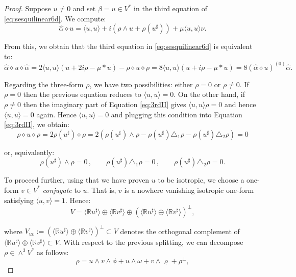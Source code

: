 \documentclass[10pt,a4paper]{amsart}
\newcommand{\escal}[1]{\langle#1\rangle}
\begin{document}
\begin{proof}
Suppose $u\neq 0$ and set $\beta = u\in V^*$ in the third equation of \eqref{eq:sesquilinear6d}. We compute:
\begin{equation*}
\widehat{\alpha}\diamond u=\escal{u,u}+i(\rho\wedge u+\rho(u^\sharp))+\mu\escal{u,u}\nu.
\end{equation*}

\noindent
From this, we obtain that the third equation in \eqref{eq:sesquilinear6d} is equivalent to:
\begin{equation}
\label{eq:3rdII}
\widehat{\alpha}\diamond u\diamond\widehat{\alpha}=2\escal{u,u}(u+2i\rho-\mu*u)-\rho\diamond u\diamond\rho=8\escal{u,u}(u + i \rho  - \mu \ast u)=8 (\widehat{\alpha}\diamond u)^{(0)}\widehat{\alpha}.
\end{equation}

\noindent
Regarding the three-form $\rho$, we have two possibilities: either $\rho = 0$ or $\rho \neq 0$. If $\rho = 0$ then the previous equation reduces to $\escal{u,u} = 0$. On the other hand, if $\rho\neq  0$ then the imaginary part of Equation \eqref{eq:3rdII} gives $\escal{u,u}\rho = 0$ and hence $\escal{u,u} = 0$ again. Hence $\escal{u,u} = 0$ and plugging this condition into Equation \eqref{eq:3rdII}, we obtain:
\begin{equation*}
\rho \diamond u\diamond \rho   =  2 \rho(u^\sharp) \diamond \rho = 2 (\rho(u^\sharp) \wedge \rho - \rho(u^\sharp) \triangle_1 \rho - \rho(u^\sharp) \triangle_2 \rho) = 0
\end{equation*}
 
\noindent
or, equivalently:
\begin{equation*}
\rho(u^\sharp) \wedge \rho  = 0\, , \qquad  \rho(u^\sharp) \triangle_1 \rho = 0\, , \qquad  \rho(u^\sharp) \triangle_2 \rho = 0.
\end{equation*}

\noindent
To proceed further, using that we have proven $u$ to be isotropic,  we choose a one-form $v\in V^*$ \emph{conjugate} to $u$. That is, $v$ is a nowhere vanishing isotropic one-form satisfying $\langle u , v \rangle = 1$. Hence:
\begin{equation*}
V  = \langle \mathbb{R} u^{\sharp} \rangle \oplus \langle \mathbb{R} v^{\sharp} \rangle \oplus (\langle \mathbb{R} u^{\sharp} \rangle \oplus \langle \mathbb{R} v^{\sharp} \rangle)^{\perp},
\end{equation*}

\noindent
where $V_{uv}:=(\langle \mathbb{R} u^{\sharp} \rangle \oplus \langle \mathbb{R} v^{\sharp} \rangle)^{\perp} \subset V$ denotes the orthogonal complement of $\langle \mathbb{R} u^{\sharp} \rangle \oplus \langle \mathbb{R} v^{\sharp} \rangle \subset V$. With respect to the previous splitting, we can decompose $\rho\in\wedge^3V^*$ as follows:
\begin{equation*}
\rho=u\wedge v\wedge\phi+u\wedge\omega+v\wedge\varrho+\rho^\perp,
\end{equation*}


\end{proof}
\end{document}
